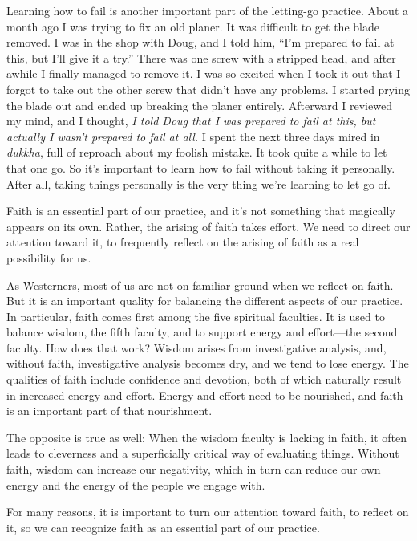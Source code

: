 Learning how to fail is another important part of the letting-go 
practice. About a month ago I was trying to fix an old planer. It was 
difficult to get the blade removed. I was in the shop with Doug, and I 
told him, ``I'm prepared to fail at this, but I'll give it a try.'' 
There was one screw with a stripped head, and after awhile I finally 
managed to remove it. I was so excited when I took it out that I forgot 
to take out the other screw that didn't have any problems. I started 
prying the blade out and ended up breaking the planer entirely. 
Afterward I reviewed my mind, and I thought, \emph{I told Doug that I 
was prepared to fail at this, but actually I wasn't prepared to fail at 
all.} I spent the next three days mired in \emph{dukkha}, full of 
reproach about my foolish mistake. It took quite a while to let that 
one go. So it's important to learn how to fail without taking it 
personally. After all, taking things personally is the very thing we're 
learning to let go of.


Faith is an essential part of our practice, and it's not something that 
magically appears on its own. Rather, the arising of faith takes 
effort. We need to direct our attention toward it, to frequently 
reflect on the arising of faith as a real possibility for us.

As Westerners, most of us are not on familiar ground when we reflect on 
faith. But it is an important quality for balancing the different 
aspects of our practice. In particular, faith comes first among the 
five spiritual faculties. It is used to balance wisdom, the fifth 
faculty, and to support energy and effort---the second faculty. How 
does that work? Wisdom arises from investigative analysis, and, without 
faith, investigative analysis becomes dry, and we tend to lose energy. 
The qualities of faith include confidence and devotion, both of which 
naturally result in increased energy and effort. Energy and effort need 
to be nourished, and faith is an important part of that nourishment.

The opposite is true as well: When the wisdom faculty is lacking in 
faith, it often leads to cleverness and a superficially critical way of 
evaluating things. Without faith, wisdom can increase our negativity, 
which in turn can reduce our own energy and the energy of the people we 
engage with.

For many reasons, it is important to turn our attention toward faith, 
to reflect on it, so we can recognize faith as an essential part of our 
practice.

